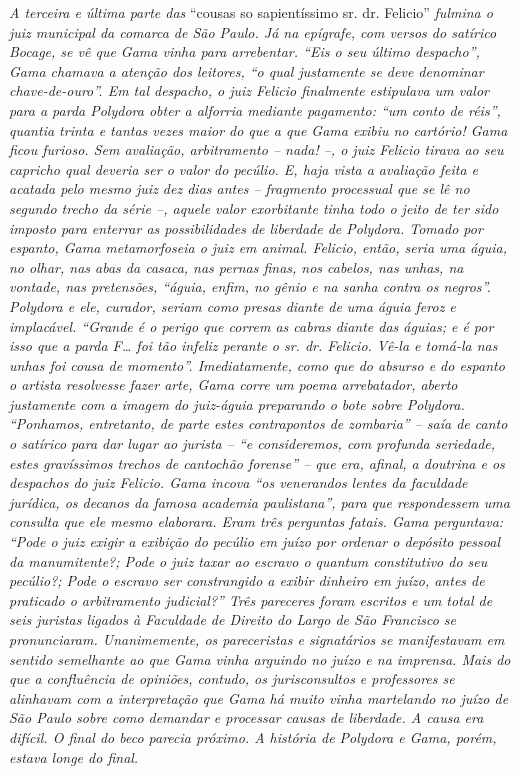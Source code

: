 \begin{didascalia}
\emph{A terceira e última parte das} ``cousas so sapientíssimo sr. dr.
Felicio'' \emph{fulmina o juiz municipal da comarca de São Paulo. Já na
epígrafe, com versos do satírico Bocage, se vê que Gama vinha para
arrebentar. ``Eis o seu último despacho'', Gama chamava a atenção dos
leitores, ``o qual justamente se deve denominar chave-de-ouro''. Em tal
despacho, o juiz Felicio finalmente estipulava um valor para a parda
Polydora obter a alforria mediante pagamento: ``um conto de réis'',
quantia trinta e tantas vezes maior do que a que Gama exibiu no
cartório! Gama ficou furioso. Sem avaliação, arbitramento -- nada! --, o
juiz Felicio tirava ao seu capricho qual deveria ser o valor do pecúlio.
E, haja vista a avaliação feita e acatada pelo mesmo juiz dez dias antes
-- fragmento processual que se lê no segundo trecho da série --, aquele
valor exorbitante tinha todo o jeito de ter sido imposto para enterrar
as possibilidades de liberdade de Polydora. Tomado por espanto, Gama
metamorfoseia o juiz em animal. Felicio, então, seria uma águia, no
olhar, nas abas da casaca, nas pernas finas, nos cabelos, nas unhas, na
vontade, nas pretensões, ``águia, enfim, no gênio e na sanha contra os
negros''. Polydora e ele, curador, seriam como presas diante de uma águia
feroz e implacável. ``Grande é o perigo que correm as cabras diante das
águias; e é por isso que a parda F\ldots{} foi tão infeliz perante o sr. dr.
Felicio. Vê-la e tomá-la nas unhas foi cousa de momento''. Imediatamente,
como que do absurso e do espanto o artista resolvesse fazer arte, Gama
corre um poema arrebatador, aberto justamente com a imagem do juiz-águia
preparando o bote sobre Polydora. ``Ponhamos, entretanto, de parte estes
contrapontos de zombaria'' -- saía de canto o satírico para dar lugar ao
jurista -- ``e consideremos, com profunda seriedade, estes gravíssimos
trechos de cantochão forense'' -- que era, afinal, a doutrina e os
despachos do juiz Felicio. Gama incova ``os venerandos lentes da
faculdade jurídica, os decanos da famosa academia paulistana'', para que
respondessem uma consulta que ele mesmo elaborara. Eram três perguntas
fatais. Gama perguntava: ``Pode o juiz exigir a exibição do pecúlio em
juízo por ordenar o depósito pessoal da manumitente?; Pode o juiz taxar
ao escravo o quantum constitutivo do seu pecúlio?; Pode o escravo ser
constrangido a exibir dinheiro em juízo, antes de praticado o
arbitramento judicial?'' Três pareceres foram escritos e um total de seis
juristas ligados à Faculdade de Direito do Largo de São Francisco se
pronunciaram. Unanimemente, os pareceristas e signatários se
manifestavam em sentido semelhante ao que Gama vinha arguindo no juízo e
na imprensa. Mais do que a confluência de opiniões, contudo, os
jurisconsultos e professores se alinhavam com a interpretação que Gama
há muito vinha martelando no juízo de São Paulo sobre como demandar e
processar causas de liberdade. A causa era difícil. O final do beco
parecia próximo. A história de Polydora e Gama, porém, estava longe do
final.}
\end{didascalia}


